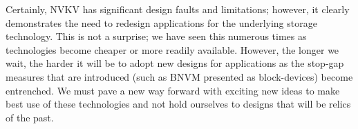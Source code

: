 Certainly, NVKV has significant design faults and limitations; however, it
clearly demonstrates the need to redesign applications for the underlying
storage technology. This is not a surprise; we have seen this numerous times as
technologies become cheaper or more readily available. However, the longer we
wait, the harder it will be to adopt new designs for applications as the
stop-gap measures that are introduced (such as BNVM presented as block-devices)
become entrenched. We must pave a new way forward with exciting new ideas
to make best use of these technologies and not hold ourselves to designs that
will be relics of the past.







